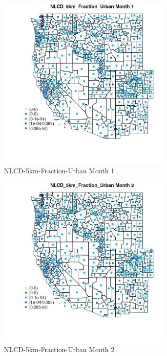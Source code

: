 \begin{figure} 
\centering  
\includegraphics[width=0.77\textwidth]{Code_Outputs/df_report_ML_predictors_CountyCentroid_Locations_Dates_2008-01-01to2018-12-31_MapObsMo1NLCD_5km_Fraction_Urban.jpg} 
\caption{\label{fig:df_report_ML_predictors_CountyCentroid_Locations_Dates_2008-01-01to2018-12-31MapObsMo1NLCD_5km_Fraction_Urban}NLCD-5km-Fraction-Urban Month 1} 
\end{figure} 
 

\clearpage 

\begin{figure} 
\centering  
\includegraphics[width=0.77\textwidth]{Code_Outputs/df_report_ML_predictors_CountyCentroid_Locations_Dates_2008-01-01to2018-12-31_MapObsMo2NLCD_5km_Fraction_Urban.jpg} 
\caption{\label{fig:df_report_ML_predictors_CountyCentroid_Locations_Dates_2008-01-01to2018-12-31MapObsMo2NLCD_5km_Fraction_Urban}NLCD-5km-Fraction-Urban Month 2} 
\end{figure} 
 


